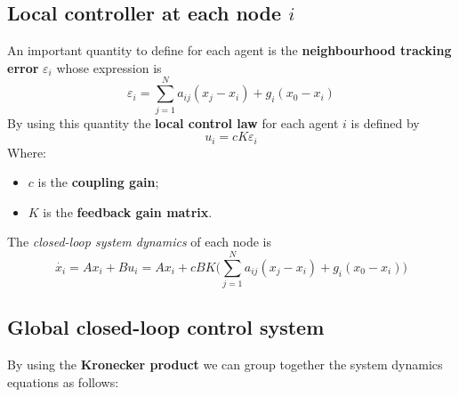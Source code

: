 \subsection{Local controller at each node $i$}
An important quantity to define for each agent is the \textbf{neighbourhood tracking error} $\varepsilon_i$ whose expression is
\begin{equation}
    \varepsilon_i = \sum_{j=1}^N {
        a_{ij}(x_j-x_i) + g_i (x_0-x_i)
    }
\end{equation}
By using this quantity the \textbf{local control law} for each agent $i$ is defined by
{\large{
    \begin{equation}
        u_i = cK\varepsilon_i
    \end{equation}
}}
Where:
\begin{itemize}
    \itemsep0em
    \item $c$ is the \textbf{coupling gain}; 
    \item $K$ is the \textbf{feedback gain matrix}.
\end{itemize}
The \textit{closed-loop system dynamics} of each node is 
\begin{equation}
    \dot{x_i} = A x_i + B u_i = A x_i + cBK \biggl(
        \sum_{j=1}^N {
        a_{ij}(x_j-x_i) + g_i (x_0-x_i)
    }
    \biggr)
\end{equation}

\subsection{Global closed-loop control system}
By using the \textbf{Kronecker product} we can group together the system dynamics equations as follows:\\

